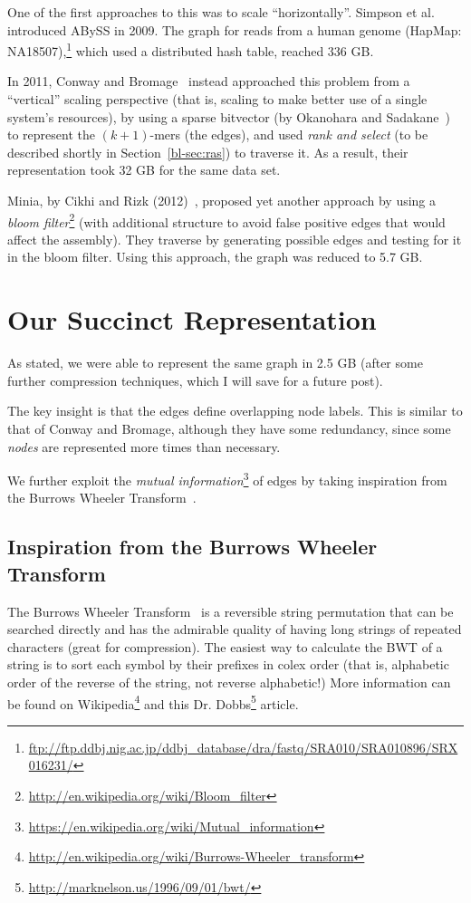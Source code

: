 One of the first approaches to this was to scale ``horizontally''. Simpson et al.~\cite{Simpson:2009} introduced ABySS in 2009. The graph for reads from a human genome (HapMap: NA18507),\footnote{\url{ftp://ftp.ddbj.nig.ac.jp/ddbj_database/dra/fastq/SRA010/SRA010896/SRX016231/}} which used a distributed hash table, reached 336 GB.

In 2011, Conway and Bromage~\cite{ConBro11} instead approached this problem from a ``vertical'' scaling perspective (that is, scaling to make better use of a single system's resources), by using a sparse bitvector (by Okanohara and Sadakane~\cite{OkaSad07}) to represent the $(k+1)$-mers (the edges), and used \emph{rank and select} (to be described shortly in Section~\ref{bl-sec:ras}) to traverse it. As a result, their representation took 32 GB for the same data set.

Minia, by Cikhi and Rizk (2012)~\cite{wabi}, proposed yet another approach by using a \emph{bloom filter}\footnote{\url{http://en.wikipedia.org/wiki/Bloom_filter}} (with additional structure to avoid false positive edges that would affect the assembly). They traverse by generating possible edges and testing for it in the bloom filter. Using this approach, the graph was reduced to 5.7 GB.

\section{Our Succinct Representation}\label{bl-sec:our}

As stated, we were able to represent the same graph in 2.5 GB (after some further compression techniques, which I will save for a future post).

The key insight is that the edges define overlapping node labels. This is similar to that of Conway and Bromage, although they have some redundancy, since some \emph{nodes} are represented more times than necessary.

We further exploit the \emph{mutual information}\footnote{\url{https://en.wikipedia.org/wiki/Mutual_information}} of edges by taking inspiration from the Burrows Wheeler Transform~\cite{BurWhe94}.

\subsection{Inspiration from the Burrows Wheeler Transform}\label{bl-sec:bur}

The Burrows Wheeler Transform~\cite{BurWhe94} is a reversible string permutation that can be searched directly and has the admirable quality of having long strings of repeated characters (great for compression). The easiest way to calculate the BWT of a string is to sort each symbol by their prefixes in colex order (that is, alphabetic order of the reverse of the string, not reverse alphabetic!) More information can be found on Wikipedia\footnote{\url{http://en.wikipedia.org/wiki/Burrows-Wheeler_transform}} and this Dr. Dobbs\footnote{\url{http://marknelson.us/1996/09/01/bwt/}} article.


